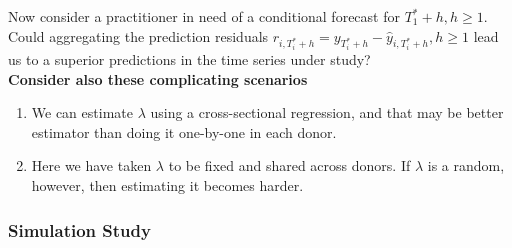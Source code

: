 \documentclass{uiucthesis2021}
\theoremstyle{definition}
\begin{document}
Now consider a practitioner in need of a conditional forecast for $T_{1}^{*}+h, h\geq 1$.  Could aggregating the prediction residuals $r_{i,T_{i}^{*}+h} = y_{T_{i}^{*}+h}-\hat y_{i, T_{i}^{*}+h}, h\geq 1$ lead us to a superior predictions in the time series under study?\\

\textbf{Consider also these complicating scenarios}
\begin{enumerate}
  \item We can estimate $\lambda$ using a cross-sectional regression, and that may be better estimator than doing it one-by-one in each donor.
  \item Here we have taken $\lambda$ to be fixed and shared across donors.  If $\lambda$ is a random, however, then estimating it becomes harder.
\end{enumerate}

\subsubsection{Simulation Study}
\end{document}
